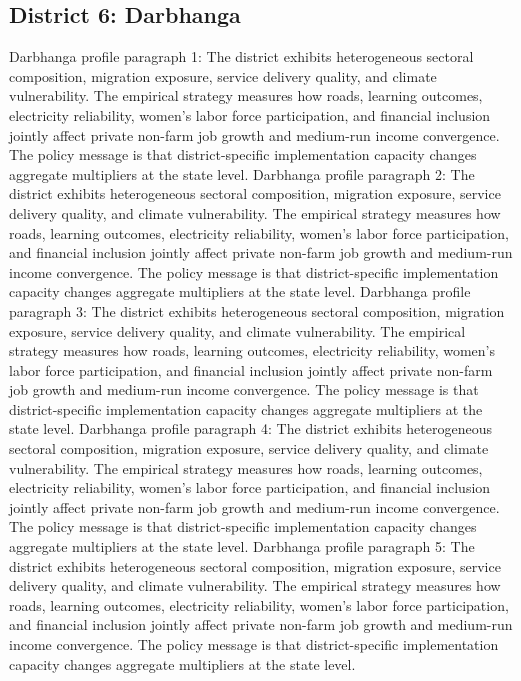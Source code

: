 \documentclass[preprint,12pt]{elsarticle}
\begin{document}
\subsection{District 6: Darbhanga}
Darbhanga profile paragraph 1: The district exhibits heterogeneous sectoral composition, migration exposure, service delivery quality, and climate vulnerability. The empirical strategy measures how roads, learning outcomes, electricity reliability, women's labor force participation, and financial inclusion jointly affect private non-farm job growth and medium-run income convergence. The policy message is that district-specific implementation capacity changes aggregate multipliers at the state level.
Darbhanga profile paragraph 2: The district exhibits heterogeneous sectoral composition, migration exposure, service delivery quality, and climate vulnerability. The empirical strategy measures how roads, learning outcomes, electricity reliability, women's labor force participation, and financial inclusion jointly affect private non-farm job growth and medium-run income convergence. The policy message is that district-specific implementation capacity changes aggregate multipliers at the state level.
Darbhanga profile paragraph 3: The district exhibits heterogeneous sectoral composition, migration exposure, service delivery quality, and climate vulnerability. The empirical strategy measures how roads, learning outcomes, electricity reliability, women's labor force participation, and financial inclusion jointly affect private non-farm job growth and medium-run income convergence. The policy message is that district-specific implementation capacity changes aggregate multipliers at the state level.
Darbhanga profile paragraph 4: The district exhibits heterogeneous sectoral composition, migration exposure, service delivery quality, and climate vulnerability. The empirical strategy measures how roads, learning outcomes, electricity reliability, women's labor force participation, and financial inclusion jointly affect private non-farm job growth and medium-run income convergence. The policy message is that district-specific implementation capacity changes aggregate multipliers at the state level.
Darbhanga profile paragraph 5: The district exhibits heterogeneous sectoral composition, migration exposure, service delivery quality, and climate vulnerability. The empirical strategy measures how roads, learning outcomes, electricity reliability, women's labor force participation, and financial inclusion jointly affect private non-farm job growth and medium-run income convergence. The policy message is that district-specific implementation capacity changes aggregate multipliers at the state level.
\end{document}
